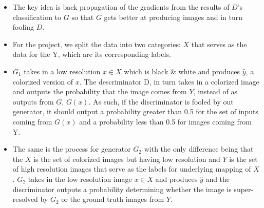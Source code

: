 \documentclass[oneside,a4paper,12pt]{report}
\begin{document}
\begin{itemize}
	\item The key idea is back propagation of the gradients from the results of $D$'s classification to $G$ so that $G$ gets better at producing images and in turn fooling $D$.
	\item For the project, we split the data into two categories: $X$ that serves as the data for the Y, which are its corresponding labels.
	\item $G_1$ takes in a low resolution $x\in X$ which is black \& white and produces $\hat{y}$, a colorized version of $x$. The descriminator D, in turn takes in a colorized image and outputs the probability that the image comes from $Y$, instead of as outputs from $G$, $G(x)$. As such, if the discriminator is fooled by out generator, it should output a probability greater than 0.5 for the set of inputs coming from $G(x)$ and a probability less than 0.5 for images coming from Y.
	\item The same is the process for generator $G_2$ with the only difference being that the $X$ is the set of colorized images but having low resolution and $Y$ is the set of high resolution images that serve as the labels for underlying mapping of $X$. $G_2$ takes in the low resolution image $x \in X$ and produces $\hat{y}$ and the discriminator outputs a probability determining whether the image is super-resolved by $G_2$ or the ground truth images from $Y$.
\end{itemize}
\end{document}
